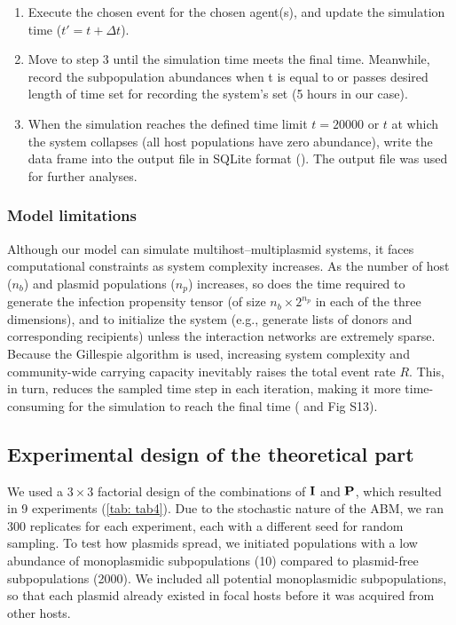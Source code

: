 \documentclass[10pt,letterpaper]{article}
\begin{document}
\begin{enumerate}
    \item Execute the chosen event for the chosen agent(s), and update the simulation time ($t' = t + \Delta t $). 
    
    \item Move to step 3 until the simulation time meets the final time. Meanwhile, record the subpopulation abundances when t is equal to or passes desired length of time set for recording the system's set (5 hours in our case). 
    
    \item When the simulation reaches the defined time limit $t = 20000$ or $t$ at which the system collapses (all host populations have zero abundance), write the data frame into the output file in SQLite format (). The output file was used for further analyses. 
\end{enumerate}

\subsubsection*{Model limitations} Although our model can simulate multihost–multiplasmid systems, it faces computational constraints as system complexity increases. As the number of host ($n_b$) and plasmid populations ($n_p$) increases, so does the time required to generate the infection propensity tensor (of size $n_b \times 2^{n_p}$ in each of the three dimensions), and to initialize the system (e.g., generate lists of donors and corresponding recipients) unless the interaction networks are extremely sparse. Because the Gillespie algorithm is used, increasing system complexity and community-wide carrying capacity inevitably raises the total event rate $R$. This, in turn, reduces the sampled time step in each iteration, making it more time-consuming for the simulation to reach the final time ( and Fig S13).


\subsection*{Experimental design of the theoretical part}
\noindent We used a $3 \times 3$ factorial design of the combinations of $\vb{I}$ and $\vb{P}$, which resulted in 9 experiments (\cref{tab: tab4}). Due to the stochastic nature of the ABM, we ran 300 replicates for each experiment, each with a different seed for random sampling. To test how plasmids spread, we initiated populations with a low abundance of monoplasmidic subpopulations (10) compared to plasmid-free subpopulations (2000). We included all potential monoplasmidic subpopulations, so that each plasmid already existed in focal hosts before it was acquired from other hosts.
\end{document}
